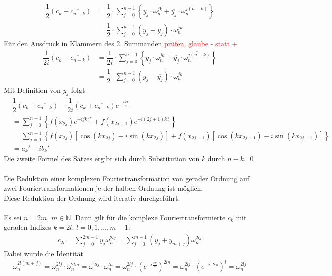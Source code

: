 \begin{align*}
  \dfrac{1}{2}\left(c_k+\overline{c_{n-k}}\right) 
  &= \dfrac{1}{2}\cdot\sum_{j=0}^{n-1}\left\{y_j\cdot\omega_n^{jk} + \overline{y_j}\cdot\overline{\omega_n^{j(n-k)}}\right\} \\
  &= \dfrac{1}{2}\cdot\sum_{j=0}^{n-1}\left(y_j+\overline{y_j}\right)\cdot\omega_n^{jk}
\end{align*}
Für den Ausdruck in Klammern des 2. Summanden \textcolor{red}{prüfen, glaube - statt +}
\begin{align*}
  \dfrac{1}{2i}\left(c_k+\overline{c_{n-k}}\right) 
  &= \dfrac{1}{2i}\cdot\sum_{j=0}^{n-1}\left\{y_j\cdot\omega_n^{jk} + \overline{y_j}\cdot\overline{\omega_n^{j(n-k)}}\right\} \\
  &= \dfrac{1}{2}\cdot\sum_{j=0}^{n-1}\left(y_j+\overline{y_j}\right)\cdot\omega_n^{jk}
\end{align*}
Mit Definition von $y_j$ folgt
\begin{align*}
  &\dfrac{1}{2}\left(c_k+\overline{c_{n-k}}\right) - \dfrac{1}{2i}\left(c_k+\overline{c_{n-k}}\right)e^{-\tfrac{ik\pi}{n}}\\
  &= \sum_{j=0}^{n-1}\left\{f(x_{2j})e^{-ijk\tfrac{2\pi}{n}}+f(x_{2j+1})e^{-i(2j+1)k\tfrac{\pi}{n}}\right\} \\
  &= \sum_{j=0}^{n-1}\left\{f(x_{2j})\left[\cos(kx_{2j})-i\sin(kx_{2j})\right]
  + f(x_{2j+1})\left[\cos(kx_{2j+1})-i\sin(kx_{2j+1})\right]\right\} \\
  &= a_k' - ib_k'
\end{align*}
Die zweite Formel des Satzes ergibt sich durch Substitution von $k$ durch $n-k$. 
\qed\\ \\
Die Reduktion einer komplexen Fouriertransformation von gerader Ordnung auf zwei Fouriertransformationen je der halben
Ordnung ist möglich. \\
Diese Reduktion der Ordnung wird iterativ durchgeführt: \\ \\
Es sei $n=2m$, $m\in\mathbb{N}$. Dann gilt für die komplexe Fouriertransformierte $c_k$ mit geraden Indizes 
$k=2l$, $l=0,1,\dots,m-1$:
\begin{align*}
  c_{2l} = \sum_{j=0}^{2m-1}y_j\omega_n^{2lj} = \sum_{j=0}^{m-1} (y_j+y_{m+j})\omega_n^{2lj}
\end{align*}
Dabei wurde die Identität 
\begin{align*}
  \omega_n^{2l(m+j)} 
  = \omega_n^{2lj}\cdot \omega_n^{2lm} 
  = \omega^{2lj}\cdot \omega_n^{ln} = \omega_n^{2lj}\cdot \left(e^{-i\tfrac{2\pi}{n}}\right)^{2ln} 
  = \omega_n^{2lj}\cdot \left(e^{-i\cdot2\pi}\right)^l 
  = \omega_n^{2lj}
\end{align*}
